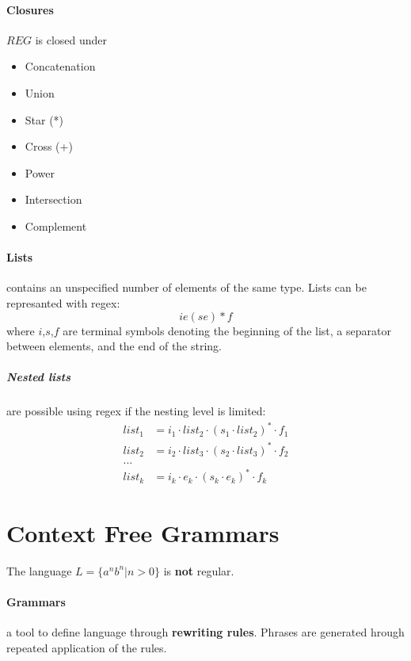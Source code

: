\documentclass{article}
\begin{document}
\paragraph{Closures} $REG$ is closed under
\begin{itemize}
\item Concatenation
\item Union
\item Star (*)
\item Cross (+)
\item Power
\item Intersection
\item Complement
\end{itemize}
\paragraph{Lists} contains an unspecified number of elements of the same type. Lists can be represanted with regex:
\[ie(se)*f\]
where $i$,$s$,$f$ are terminal symbols denoting the beginning of the list, a separator between elements, and the end of the string.
\subparagraph{Nested lists} are possible using regex if the nesting level is limited:
\begin{align*}
list_1 &= i_1 \cdot list_2 \cdot (s_1 \cdot list_2)^* \cdot f_1\\
list_2 &= i_2 \cdot list_3 \cdot (s_2 \cdot list_3)^* \cdot f_2\\
... &\\
list_k &= i_k \cdot e_k \cdot (s_k \cdot e_k)^* \cdot f_k
\end{align*}




\section{Context Free Grammars}
The language $L=\{a^nb^n|n>0\}$ is \textbf{not} regular.
\paragraph{Grammars} a tool to define language through \textbf{rewriting rules}. Phrases are generated hrough repeated application of the rules.
\end{document}
